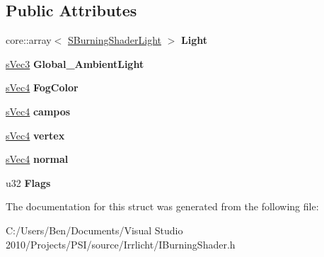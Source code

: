 \subsection*{Public Attributes}
\begin{DoxyCompactItemize}
\item 
\hypertarget{structirr_1_1video_1_1_s_burning_shader_light_space_a9158ecc4b1517837927cf00669343b01}{core\-::array$<$ \hyperlink{structirr_1_1video_1_1_s_burning_shader_light}{S\-Burning\-Shader\-Light} $>$ {\bfseries Light}}\label{structirr_1_1video_1_1_s_burning_shader_light_space_a9158ecc4b1517837927cf00669343b01}

\item 
\hypertarget{structirr_1_1video_1_1_s_burning_shader_light_space_aed874cdc9b1d1aec1f9b12c3517e1e46}{\hyperlink{structirr_1_1video_1_1s_vec3}{s\-Vec3} {\bfseries Global\-\_\-\-Ambient\-Light}}\label{structirr_1_1video_1_1_s_burning_shader_light_space_aed874cdc9b1d1aec1f9b12c3517e1e46}

\item 
\hypertarget{structirr_1_1video_1_1_s_burning_shader_light_space_a7d83dd33ea4503d75cd76c583850e5a5}{\hyperlink{structirr_1_1video_1_1s_vec4}{s\-Vec4} {\bfseries Fog\-Color}}\label{structirr_1_1video_1_1_s_burning_shader_light_space_a7d83dd33ea4503d75cd76c583850e5a5}

\item 
\hypertarget{structirr_1_1video_1_1_s_burning_shader_light_space_aab0f03c14c2a5f8834894ccb473fb79a}{\hyperlink{structirr_1_1video_1_1s_vec4}{s\-Vec4} {\bfseries campos}}\label{structirr_1_1video_1_1_s_burning_shader_light_space_aab0f03c14c2a5f8834894ccb473fb79a}

\item 
\hypertarget{structirr_1_1video_1_1_s_burning_shader_light_space_a5c566f9eb67308caa5691f232bd66de8}{\hyperlink{structirr_1_1video_1_1s_vec4}{s\-Vec4} {\bfseries vertex}}\label{structirr_1_1video_1_1_s_burning_shader_light_space_a5c566f9eb67308caa5691f232bd66de8}

\item 
\hypertarget{structirr_1_1video_1_1_s_burning_shader_light_space_a82f9590b65f44940880d6499db133141}{\hyperlink{structirr_1_1video_1_1s_vec4}{s\-Vec4} {\bfseries normal}}\label{structirr_1_1video_1_1_s_burning_shader_light_space_a82f9590b65f44940880d6499db133141}

\item 
\hypertarget{structirr_1_1video_1_1_s_burning_shader_light_space_a5cca2d8b1bdd837f0dff4177100b3b1c}{u32 {\bfseries Flags}}\label{structirr_1_1video_1_1_s_burning_shader_light_space_a5cca2d8b1bdd837f0dff4177100b3b1c}

\end{DoxyCompactItemize}


The documentation for this struct was generated from the following file\-:\begin{DoxyCompactItemize}
\item 
C\-:/\-Users/\-Ben/\-Documents/\-Visual Studio 2010/\-Projects/\-P\-S\-I/source/\-Irrlicht/I\-Burning\-Shader.\-h\end{DoxyCompactItemize}
